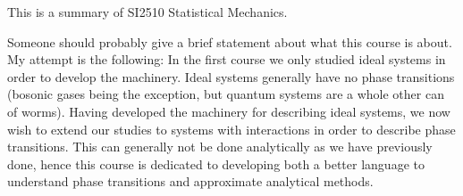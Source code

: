 This is a summary of SI2510 Statistical Mechanics.

Someone should probably give a brief statement about what this course is about. My attempt is the following: In the first course we only studied ideal systems in order to develop the machinery. Ideal systems generally have no phase transitions (bosonic gases being the exception, but quantum systems are a whole other can of worms). Having developed the machinery for describing ideal systems, we now wish to extend our studies to systems with interactions in order to describe phase transitions. This can generally not be done analytically as we have previously done, hence this course is dedicated to developing both a better language to understand phase transitions and approximate analytical methods.